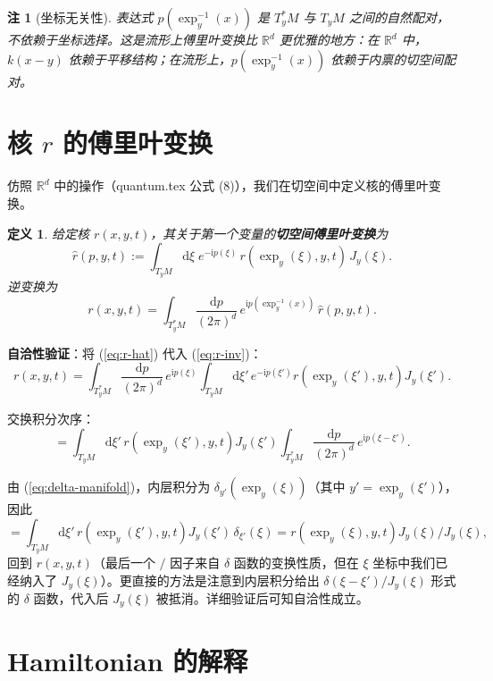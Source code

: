 \documentclass{book}
\newcommand{\assign}{:=}
\newcommand{\mathd}{\mathrm{d}}
\newcommand{\mathi}{\mathrm{i}}
\newcommand{\mathpi}{\pi}
\newtheorem{definition}{定义}[chapter]
\newtheorem{remark}{注}[chapter]
\begin{document}
\begin{remark}[坐标无关性]
  表达式 $p(\exp_y^{-1}(x))$ 是 $T_y^*M$ 与 $T_yM$ 之间的自然配对，不依赖于坐标选择。这是流形上傅里叶变换比 $\mathbb{R}^d$ 更优雅的地方：在 $\mathbb{R}^d$ 中，$k(x-y)$ 依赖于平移结构；在流形上，$p(\exp_y^{-1}(x))$ 依赖于内禀的切空间配对。
\end{remark}

\section{核 $r$ 的傅里叶变换}

仿照 $\mathbb{R}^d$ 中的操作（quantum.tex 公式 (8)），我们在切空间中定义核的傅里叶变换。

\begin{definition}
  给定核 $r(x,y,t)$，其关于第一个变量的\textbf{切空间傅里叶变换}为
  \begin{equation}
    \hat{r}(p,y,t) \assign \int_{T_yM} \mathd \xi \; e^{- \mathi p(\xi)} \, r(\exp_y(\xi), y, t) \, J_y(\xi). \label{eq:r-hat}
  \end{equation}
  逆变换为
  \begin{equation}
    r(x,y,t) = \int_{T_y^*M} \frac{\mathd p}{(2\mathpi)^d} \, e^{\mathi p(\exp_y^{-1}(x))} \, \hat{r}(p,y,t). \label{eq:r-inv}
  \end{equation}
\end{definition}

\textbf{自洽性验证}：将 (\ref{eq:r-hat}) 代入 (\ref{eq:r-inv})：
\[
r(x,y,t) = \int_{T_y^*M} \frac{\mathd p}{(2\mathpi)^d} \, e^{\mathi p(\xi)} \int_{T_yM} \mathd \xi' \, e^{-\mathi p(\xi')} r(\exp_y(\xi'), y, t) J_y(\xi').
\]

交换积分次序：
\[
= \int_{T_yM} \mathd \xi' \, r(\exp_y(\xi'), y, t) J_y(\xi') \int_{T_y^*M} \frac{\mathd p}{(2\mathpi)^d} \, e^{\mathi p(\xi - \xi')}.
\]

由 (\ref{eq:delta-manifold})，内层积分为 $\delta_{y'}(\exp_y(\xi))$（其中 $y' = \exp_y(\xi')$），因此
\[
= \int_{T_yM} \mathd \xi' \, r(\exp_y(\xi'), y, t) J_y(\xi') \, \delta_{\xi'}(\xi) = r(\exp_y(\xi), y, t) J_y(\xi) / J_y(\xi),
\]
回到 $r(x,y,t)$（最后一个 $/$ 因子来自 $\delta$ 函数的变换性质，但在 $\xi$ 坐标中我们已经纳入了 $J_y(\xi)$）。更直接的方法是注意到内层积分给出 $\delta(\xi - \xi')/J_y(\xi)$ 形式的 $\delta$ 函数，代入后 $J_y(\xi)$ 被抵消。详细验证后可知自洽性成立。

\section{Hamiltonian 的解释}
\end{document}
